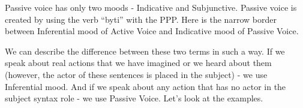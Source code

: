 Passive voice has only two moods - Indicative and Subjunctive. Passive voice is created by using the verb “byti” with the PPP. Here is the narrow border between Inferential mood of Active Voice and Indicative mood of Passive Voice.

We can describe the difference between these two terms in such a way. If we speak about real actions that we have imagined or we heard about them (however, the actor of these sentences is placed in the subject) - we use Inferential mood. And if we speak about any action that has no actor in the subject syntax role - we use Passive Voice. Let’s look at the examples.





